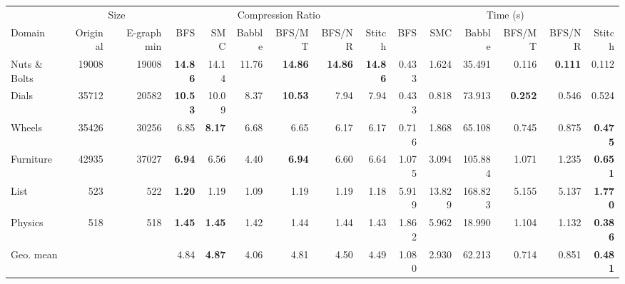 \begin{tabular}{l r r rrrrrr rrrrrr}
\toprule
& \multicolumn{2}{c}{Size} & \multicolumn{6}{c}{Compression Ratio} & \multicolumn{6}{c}{Time (s)} \\
\cmidrule(lr){2-3} \cmidrule(lr){4-9} \cmidrule(lr){10-15}
Domain & Original & E-graph min & BFS & SMC & Babble & BFS/MT & BFS/NR & Stitch & BFS & SMC & Babble & BFS/MT & BFS/NR & Stitch \\
\midrule
Nuts \& Bolts & 19008 & 19008 & \textbf{14.86} & 14.14 & 11.76 & \textbf{14.86} & \textbf{14.86} & \textbf{14.86} & 0.433 & 1.624 & 35.491 & 0.116 & \textbf{0.111} & 0.112 \\
Dials & 35712 & 20582 & \textbf{10.53} & 10.09 & 8.37 & \textbf{10.53} & 7.94 & 7.94 & 0.433 & 0.818 & 73.913 & \textbf{0.252} & 0.546 & 0.524 \\
Wheels & 35426 & 30256 & 6.85 & \textbf{8.17} & 6.68 & 6.65 & 6.17 & 6.17 & 0.716 & 1.868 & 65.108 & 0.745 & 0.875 & \textbf{0.475} \\
Furniture & 42935 & 37027 & \textbf{6.94} & 6.56 & 4.40 & \textbf{6.94} & 6.60 & 6.64 & 1.075 & 3.094 & 105.884 & 1.071 & 1.235 & \textbf{0.651} \\
List & 523 & 522 & \textbf{1.20} & 1.19 & 1.09 & 1.19 & 1.19 & 1.18 & 5.919 & 13.829 & 168.823 & 5.155 & 5.137 & \textbf{1.770} \\
Physics & 518 & 518 & \textbf{1.45} & \textbf{1.45} & 1.42 & 1.44 & 1.44 & 1.43 & 1.862 & 5.962 & 18.990 & 1.104 & 1.132 & \textbf{0.386} \\
\midrule
Geo. mean &  &  & 4.84 & \textbf{4.87} & 4.06 & 4.81 & 4.50 & 4.49 & 1.080 & 2.930 & 62.213 & 0.714 & 0.851 & \textbf{0.481} \\
\bottomrule
\end{tabular}

